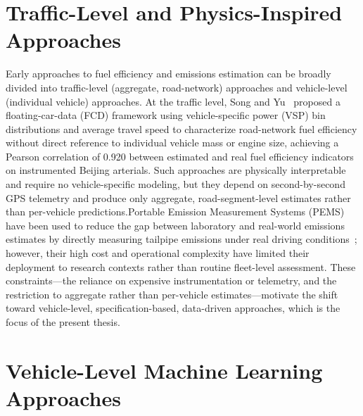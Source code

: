 \section{Traffic-Level and Physics-Inspired Approaches}

Early approaches to fuel efficiency and emissions estimation can be broadly divided into traffic-level (aggregate, road-network) approaches and vehicle-level (individual vehicle) approaches. At the traffic level, Song and Yu~\cite{song2009estimation} proposed a floating-car-data (FCD) framework using vehicle-specific power (VSP) bin distributions and average travel speed to characterize road-network fuel efficiency without direct reference to individual vehicle mass or engine size, achieving a Pearson correlation of 0.920 between estimated and real fuel efficiency indicators on instrumented Beijing arterials. Such approaches are physically interpretable and require no vehicle-specific modeling, but they depend on second-by-second GPS telemetry and produce only aggregate, road-segment-level estimates rather than per-vehicle predictions.Portable Emission Measurement Systems (PEMS) have been used to reduce the gap between laboratory and real-world emissions estimates by directly measuring tailpipe emissions under real driving conditions~\cite{mkadziel2024instantaneous}; however, their high cost and operational complexity have limited their deployment to research contexts rather than routine fleet-level assessment. These constraints---the reliance on expensive instrumentation or telemetry, and the restriction to aggregate rather than per-vehicle estimates---motivate the shift toward vehicle-level, specification-based, data-driven approaches, which is the focus of the present thesis.

\section{Vehicle-Level Machine Learning Approaches}

